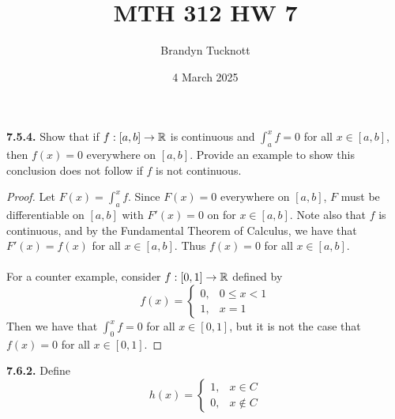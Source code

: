 \documentclass{exam}
\title{MTH 312 HW 7}
\author{Brandyn Tucknott}
\date{4 March 2025}
\begin{document}
\maketitle


\textbf{7.5.4. }
Show that if $f: [a, b] \rightarrow \mathbb {R}$ is continuous and $\int_a^x f = 0$ for all $x\in [a, b]$, then $f(x) = 0$ everywhere on $[a, b]$. Provide an example to show this conclusion does not follow if $f$ is not continuous.

\begin{proof}
    Let $F(x) = \int_a^x f$. Since $F(x) = 0$ everywhere on $[a, b]$, $F$ must be differentiable on $[a, b]$ with $F'(x) = 0$ on for $x\in[a, b]$. Note also that $f$ is continuous, and by the Fundamental Theorem of Calculus, we have that $F'(x) = f(x)$ for all $x\in [a, b]$. Thus $f(x) = 0$ for all $x\in[a, b]$. \\\\
    For a counter example, consider $f: [0, 1] \rightarrow \mathbb {R}$ defined by
    $$f(x) = \begin{cases}
        0, & 0 \leq x < 1 \\
        1, & x = 1
    \end{cases}$$
    Then we have that $\int_0^x f = 0$ for all $x\in [0, 1]$, but it is not the case that $f(x) = 0$ for all $x\in [0, 1]$.
\end{proof}

\newpage
\textbf{7.6.2. }
Define
$$h(x) = \begin{cases}
    1, & x\in C \\
    0, & x\notin C
\end{cases}$$
\end{document}
